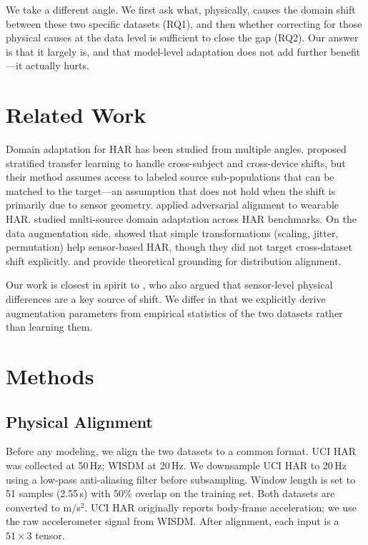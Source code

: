\documentclass[12pt]{article}
\begin{document}
We take a different angle. We first ask what, physically, causes the domain shift between these two specific datasets (RQ1), and then whether correcting for those physical causes at the data level is sufficient to close the gap (RQ2). Our answer is that it largely is, and that model-level adaptation does not add further benefit—it actually hurts.

\section{Related Work}

Domain adaptation for HAR has been studied from multiple angles. \citet{wang2018stratified} proposed stratified transfer learning to handle cross-subject and cross-device shifts, but their method assumes access to labeled source sub-populations that can be matched to the target—an assumption that does not hold when the shift is primarily due to sensor geometry. \citet{chen2019cross} applied adversarial alignment to wearable HAR. \citet{wilson2020multi} studied multi-source domain adaptation across HAR benchmarks. On the data augmentation side, \citet{um2017data} showed that simple transformations (scaling, jitter, permutation) help sensor-based HAR, though they did not target cross-dataset shift explicitly. \citet{sagawa2019distributionally} and \citet{sun2016deep} provide theoretical grounding for distribution alignment.

Our work is closest in spirit to \citet{mathur2021unsupervised}, who also argued that sensor-level physical differences are a key source of shift. We differ in that we explicitly derive augmentation parameters from empirical statistics of the two datasets rather than learning them.

\section{Methods}

\subsection{Physical Alignment}

Before any modeling, we align the two datasets to a common format. UCI HAR was collected at 50\,Hz; WISDM at 20\,Hz. We downsample UCI HAR to 20\,Hz using a low-pass anti-aliasing filter before subsampling. Window length is set to 51 samples (2.55\,s) with 50\% overlap on the training set. Both datasets are converted to m/s$^2$. UCI HAR originally reports body-frame acceleration; we use the raw accelerometer signal from WISDM. After alignment, each input is a $51 \times 3$ tensor.
\end{document}

